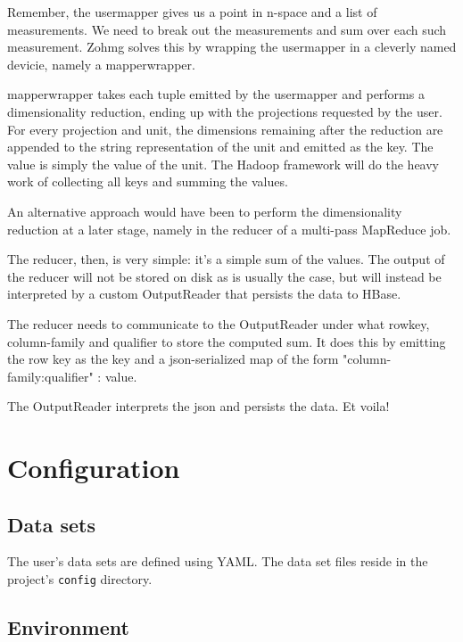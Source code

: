 \documentclass[a4paper,10pt]{book}
\begin{document}
Remember, the usermapper gives us a point in n-space and a list of
measurements. We need to break out the measurements and sum over each such
measurement. Zohmg solves this by wrapping the usermapper in a cleverly named
devicie, namely a mapperwrapper.

mapperwrapper takes each tuple emitted by the usermapper and performs a
dimensionality reduction, ending up with the projections requested by the
user. For every projection and unit, the dimensions remaining after the
reduction are appended to the string representation of the unit and emitted as
the key. The value is simply the value of the unit. The Hadoop framework will
do the heavy work of collecting all keys and summing the values.

An alternative approach would have been to perform the dimensionality
reduction at a later stage, namely in the reducer of a multi-pass MapReduce
job.

The reducer, then, is very simple: it's a simple sum of the values. The output
of the reducer will not be stored on disk as is usually the case, but will
instead be interpreted by a custom OutputReader that persists the data to
HBase.

The reducer needs to communicate to the OutputReader under what rowkey,
column-family and qualifier to store the computed sum. It does this by
emitting the row key as the key and a json-serialized map of the form
{"column-family:qualifier" : value}.

The OutputReader interprets the json and persists the data. Et voila!


\section{Configuration}

\subsection{Data sets}


The user's data sets are defined using YAML. The data set files reside in
the project's \texttt{config} directory.


\subsection{Environment}
\end{document}
